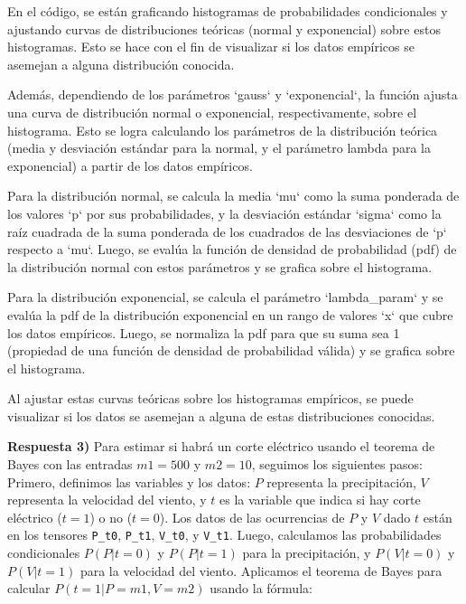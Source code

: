 \documentclass[spanish]{article}
\begin{document}
\vspace{5px}
En el código, se están graficando histogramas de probabilidades condicionales y ajustando curvas de distribuciones teóricas (normal y exponencial) sobre estos histogramas. Esto se hace con el fin de visualizar si los datos empíricos se asemejan a alguna distribución conocida.

\vspace{5px}
Además, dependiendo de los parámetros `gauss` y `exponencial`, la función ajusta una curva de distribución normal o exponencial, respectivamente, sobre el histograma. Esto se logra calculando los parámetros de la distribución teórica (media y desviación estándar para la normal, y el parámetro lambda para la exponencial) a partir de los datos empíricos.

\vspace{5px}
Para la distribución normal, se calcula la media `mu` como la suma ponderada de los valores `p` por sus probabilidades, y la desviación estándar `sigma` como la raíz cuadrada de la suma ponderada de los cuadrados de las desviaciones de `p` respecto a `mu`. Luego, se evalúa la función de densidad de probabilidad (pdf) de la distribución normal con estos parámetros y se grafica sobre el histograma.

\vspace{5px}
Para la distribución exponencial, se calcula el parámetro `lambda\_param` y se evalúa la pdf de la distribución exponencial en un rango de valores `x` que cubre los datos empíricos. Luego, se normaliza la pdf para que su suma sea 1 (propiedad de una función de densidad de probabilidad válida) y se grafica sobre el histograma.

\vspace{5px}
Al ajustar estas curvas teóricas sobre los histogramas empíricos, se puede visualizar si los datos se asemejan a alguna de estas distribuciones conocidas. 

\newpage
\textbf{Respuesta 3)}
\vspace{5px}
Para estimar si habrá un corte eléctrico usando el teorema de Bayes con las entradas \( m1 = 500 \) y \( m2 = 10 \), seguimos los siguientes pasos: Primero, definimos las variables y los datos: \( P \) representa la precipitación, \( V \) representa la velocidad del viento, y \( t \) es la variable que indica si hay corte eléctrico (\( t = 1 \)) o no (\( t = 0 \)). Los datos de las ocurrencias de \( P \) y \( V \) dado \( t \) están en los tensores \texttt{P\_t0}, \texttt{P\_t1}, \texttt{V\_t0}, y \texttt{V\_t1}. Luego, calculamos las probabilidades condicionales \( P(P | t = 0) \) y \( P(P | t = 1) \) para la precipitación, y \( P(V | t = 0) \) y \( P(V | t = 1) \) para la velocidad del viento. Aplicamos el teorema de Bayes para calcular \( P(t = 1 | P = m1, V = m2) \) usando la fórmula:
\end{document}

